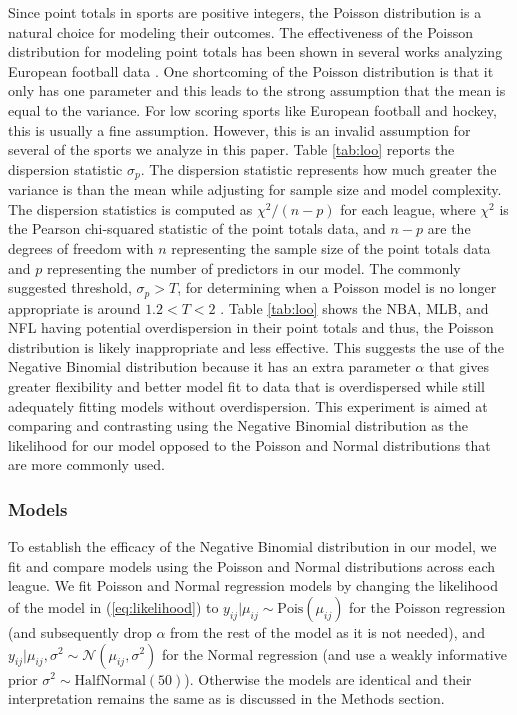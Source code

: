 Since point totals in sports are positive integers, the Poisson distribution is a natural choice for modeling their outcomes. The effectiveness of the Poisson distribution for modeling point totals has been shown in several works analyzing European football data \cite{Karlis2003} \cite{Baio2010} \cite{Benz2020}. One shortcoming of the Poisson distribution is that it only has one parameter and this leads to the strong assumption that the mean is equal to the variance. For low scoring sports like European football and hockey, this is usually a fine assumption. However, this is an invalid assumption for several of the sports we analyze in this paper. Table \ref{tab:loo} reports the dispersion statistic \(\sigma_p\). The dispersion statistic represents how much greater the variance is than the mean while adjusting for sample size and model complexity. The dispersion statistics is computed as  \(\chi^2/(n-p)\) for each league, where \(\chi^2\) is the Pearson chi-squared statistic of the point totals data, and \(n-p\) are the degrees of freedom with \(n\) representing the sample size of the point totals data and \(p\) representing the number of predictors in our model. The commonly suggested threshold, \(\sigma_p > T\), for determining when a Poisson model is no longer appropriate is around \(1.2 < T < 2\) \cite{Payne2018} \cite{Cameron1990}. Table \ref{tab:loo} shows the NBA, MLB, and NFL having potential overdispersion in their point totals and thus, the Poisson distribution is likely inappropriate and less effective. This suggests the use of the Negative Binomial distribution because it has an extra parameter \(\alpha\) that gives greater flexibility and better model fit to data that is overdispersed while still adequately fitting models without overdispersion. This experiment is aimed at comparing and contrasting using the Negative Binomial distribution as the likelihood for our model opposed to the Poisson and Normal distributions that are more commonly used.

\subsubsection*{Models}

To establish the efficacy of the Negative Binomial distribution in our model, we fit and compare models using the Poisson and Normal distributions across each league. We fit Poisson and Normal regression models by changing the likelihood of the model in (\ref{eq:likelihood}) to \(y_{ij} | \mu_{ij} \sim \text{Pois}(\mu_{ij})\) for the Poisson regression (and subsequently drop \(\alpha\) from the rest of the model as it is not needed), and \(y_{ij} | \mu_{ij}, \sigma^2 \sim \mathcal{N}(\mu_{ij}, \sigma^2)\) for the Normal regression (and use a weakly informative prior \(\sigma^2 \sim \text{HalfNormal}(50)\)). Otherwise the models are identical and their interpretation remains the same as is discussed in the Methods section.

